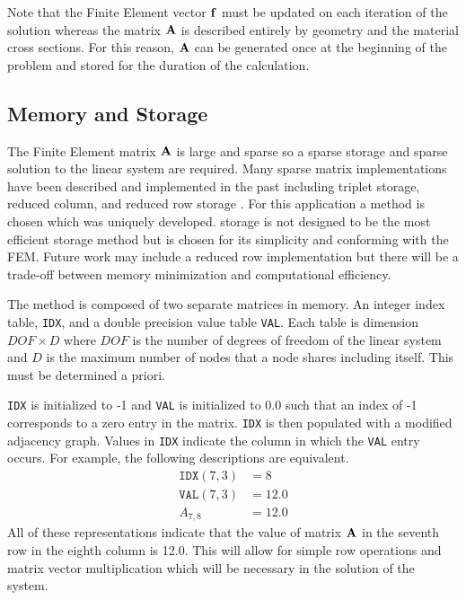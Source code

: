    Note that the Finite Element vector $\mathbf{f}$ must be updated on each iteration
    of the solution whereas the matrix $\mathbf{A}$ is described entirely by geometry 
    and the material cross sections. For this reason, $\mathbf{A}$ can be generated 
    once at the beginning of the problem and stored for the duration of the 
    calculation.
    \FloatBarrier %
  \subsection{Memory and Storage}
    The Finite Element matrix $\mathbf{A}$ is large and sparse so a sparse storage and
    sparse solution to the linear system are required. Many sparse matrix 
    implementations have been described and implemented in the past including
    triplet storage, reduced column, and reduced row storage \cite{sparseBLAS}.
    For this application a \twotable method is chosen which was uniquely 
    developed. \twotable storage is not designed to be the most efficient 
    storage method but is chosen for its simplicity and conforming with the 
    FEM. Future work may include a reduced row implementation but there will be
    a trade-off between memory minimization and computational efficiency.
    
    The \twotable method is composed of two separate matrices in memory. An 
    integer index table, \texttt{IDX}, and a double precision value table
    \texttt{VAL}. Each table is dimension $DOF \times D$ where $DOF$ is the
    number of degrees of freedom of the linear system and $D$ is the maximum
    number of nodes that a node shares including itself. This must be determined
    a priori. 
    
    \texttt{IDX} is initialized to -1 and \texttt{VAL} is initialized 
    to 0.0 such that an index of -1 corresponds to a zero entry in the 
    matrix. \texttt{IDX} is then populated with a modified adjacency graph. 
    Values in \texttt{IDX} indicate the column in which the \texttt{VAL} entry
    occurs. For example, the following descriptions are equivalent.
    \begin{align}
      \texttt{IDX}(7,3) &= 8 \\
      \texttt{VAL}(7,3) &= 12.0 \\
      A_{7,8} &= 12.0
    \end{align}
    All of these representations indicate that the value of matrix $\mathbf{A}$ in the
    seventh row in the eighth column is 12.0. This will allow for simple row 
    operations and matrix vector multiplication which will be necessary in the 
    solution of the system.
    
